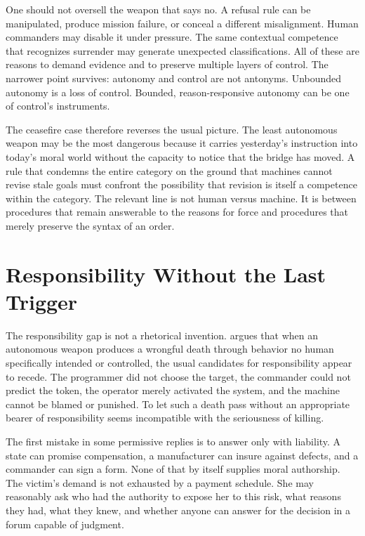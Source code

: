 \documentclass[11pt]{article}
\begin{document}
One should not oversell the weapon that says no. A refusal rule can be manipulated, produce mission failure, or conceal a different misalignment. Human commanders may disable it under pressure. The same contextual competence that recognizes surrender may generate unexpected classifications. All of these are reasons to demand evidence and to preserve multiple layers of control. The narrower point survives: autonomy and control are not antonyms. Unbounded autonomy is a loss of control. Bounded, reason-responsive autonomy can be one of control's instruments.

The ceasefire case therefore reverses the usual picture. The least autonomous weapon may be the most dangerous because it carries yesterday's instruction into today's moral world without the capacity to notice that the bridge has moved. A rule that condemns the entire category on the ground that machines cannot revise stale goals must confront the possibility that revision is itself a competence within the category. The relevant line is not human versus machine. It is between procedures that remain answerable to the reasons for force and procedures that merely preserve the syntax of an order.

\section{Responsibility Without the Last Trigger}
\label{sec:responsibility}

The responsibility gap is not a rhetorical invention. \citet{sparrow2007} argues that when an autonomous weapon produces a wrongful death through behavior no human specifically intended or controlled, the usual candidates for responsibility appear to recede. The programmer did not choose the target, the commander could not predict the token, the operator merely activated the system, and the machine cannot be blamed or punished. To let such a death pass without an appropriate bearer of responsibility seems incompatible with the seriousness of killing.

The first mistake in some permissive replies is to answer only with liability. A state can promise compensation, a manufacturer can insure against defects, and a commander can sign a form. None of that by itself supplies moral authorship. The victim's demand is not exhausted by a payment schedule. She may reasonably ask who had the authority to expose her to this risk, what reasons they had, what they knew, and whether anyone can answer for the decision in a forum capable of judgment.
\end{document}
